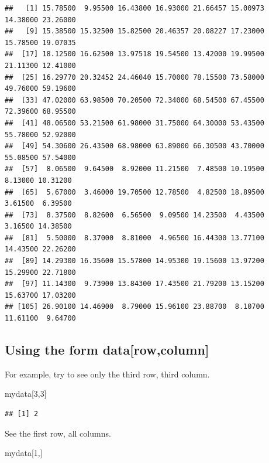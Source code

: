 \documentclass[
]{book}
\newenvironment{Shaded}{\begin{snugshade}}{\end{snugshade}}
\newcommand{\DecValTok}[1]{\textcolor[rgb]{0.00,0.00,0.81}{#1}}
\newcommand{\NormalTok}[1]{#1}
\begin{document}
\begin{verbatim}
##   [1] 15.78500  9.95500 16.43800 16.93000 21.66457 15.00973 14.38000 23.26000
##   [9] 15.38500 15.32500 15.82500 20.46357 20.08227 17.23000 15.78500 19.07035
##  [17] 18.12500 16.62500 13.97518 19.54500 13.42000 19.99500 21.11300 12.41000
##  [25] 16.29770 20.32452 24.46040 15.70000 78.15500 73.58000 49.76000 59.19600
##  [33] 47.02000 63.98500 70.20500 72.34000 68.54500 67.45500 72.39600 68.95500
##  [41] 48.06500 53.21500 61.98000 31.75000 64.30000 53.43500 55.78000 52.92000
##  [49] 54.30600 26.43500 68.98000 63.89000 66.30500 43.70000 55.08500 57.54000
##  [57]  8.06500  9.64500  8.92000 11.21500  7.48500 10.19500  8.13000 10.31200
##  [65]  5.67000  3.46000 19.70500 12.78500  4.82500 18.89500  3.61500  6.39500
##  [73]  8.37500  8.82600  6.56500  9.09500 14.23500  4.43500  3.16500 14.38500
##  [81]  5.50000  8.37000  8.81000  4.96500 16.44300 13.77100 14.43500 22.26200
##  [89] 14.29300 16.35600 15.57800 14.95300 19.15600 13.97200 15.29900 22.71800
##  [97] 11.14300  9.73900 13.84300 17.43500 21.79200 13.15200 15.63700 17.03200
## [105] 26.90100 14.46900  8.79000 15.96100 23.88700  8.10700 11.61100  9.64700
\end{verbatim}

\hypertarget{using-the-form-datarowcolumn}{%
\subsection{Using the form data{[}row,column{]}}\label{using-the-form-datarowcolumn}}

For example, try to see only the third row, third column.

\begin{Shaded}
\begin{Highlighting}[]
\NormalTok{mydata[}\DecValTok{3}\NormalTok{,}\DecValTok{3}\NormalTok{]}
\end{Highlighting}
\end{Shaded}

\begin{verbatim}
## [1] 2
\end{verbatim}

See the first row, all columns.

\begin{Shaded}
\begin{Highlighting}[]
\NormalTok{mydata[}\DecValTok{1}\NormalTok{,]}
\end{Highlighting}
\end{Shaded}
\end{document}
